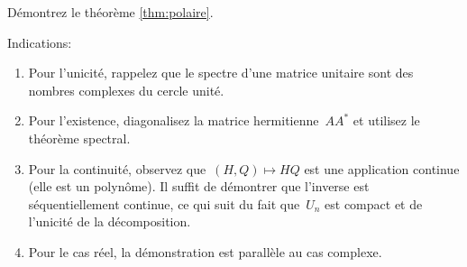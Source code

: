 \begin{exercice}
	Démontrez le théorème \ref{thm:polaire}.
\end{exercice}
\vspace{-1em}
Indications:
\begin{enumerate}
	\item Pour l'unicité, rappelez que le spectre d'une matrice
		unitaire sont des nombres complexes du cercle unité.
	\item Pour l'existence, diagonalisez la matrice hermitienne~$AA^*$ et
		utilisez le théorème spectral.
	\item Pour la continuité, observez que~$(H,Q)\mapsto HQ$ est une
		application continue (elle est un polynôme).  Il suffit de démontrer
		que l'inverse est séquentiellement continue, ce qui suit du fait
		que~$U_n$ est compact et de l'unicité de la décomposition.
	\item Pour le cas réel, la démonstration est parallèle au cas complexe.
\end{enumerate}
